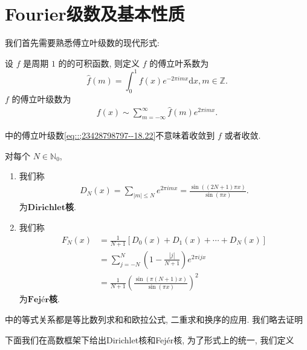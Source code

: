\documentclass[../../main.tex]{subfiles}
\begin{document}
\section{Fourier级数及基本性质}

我们首先需要熟悉傅立叶级数的现代形式:

\begin{definition}\label{definition:定义18.2}
设 $f$ 是周期 $1$ 的的可积函数, 则定义 $f$ 的傅立叶系数为
\[
\hat{f}(m) = \int_{0}^{1} f(x) e^{-2\pi i m x} \mathrm{d}x, m \in \mathbb{Z}.
\]
$f$ 的傅立叶级数为
\begin{align*}
f(x) \sim \sum_{m = -\infty}^{\infty} \hat{f}(m) e^{2\pi i m x}.
\end{align*}
\end{definition}
\begin{remark}
中的傅立叶级数\eqref{eq::;23428798797--18.22}不意味着收敛到 $f$ 或者收敛.
\end{remark}

\begin{definition}\label{definition:定义18.3}
对每个 $N \in \mathbb{N}_0$,
\begin{enumerate}
\item 我们称
\begin{align*}
D_N(x) = \sum_{|m| \leqslant N} e^{2\pi i m x} = \frac{\sin((2N + 1)\pi x)}{\sin(\pi x)}. 
\end{align*}
为$\mathbf{Dirichlet}$\textbf{核}.

\item 我们称
\begin{align*}
F_N(x) &= \frac{1}{N + 1}[D_0(x) + D_1(x) + \cdots + D_N(x)] \\
&= \sum_{j = -N}^{N} \left(1 - \frac{|j|}{N + 1}\right) e^{2\pi i j x} \\
&= \frac{1}{N + 1} \left( \frac{\sin(\pi (N + 1) x)}{\sin(\pi x)} \right)^2
\end{align*}
为$\mathbf{Fejér}$\textbf{核}.
\end{enumerate}
\end{definition}
\begin{remark}
中的等式关系都是等比数列求和和欧拉公式, 二重求和换序的应用. 我们略去证明
\end{remark}

下面我们在高数框架下给出Dirichlet核和Fejér核, 为了形式上的统一, 我们定义
\end{document}
